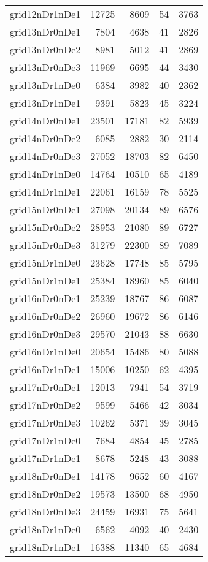 \begin{tabular}{lrrrr}
grid12nDr1nDe1 & 12725 & 8609 & 54 & 3763 \\
grid13nDr0nDe1 & 7804 & 4638 & 41 & 2826 \\
grid13nDr0nDe2 & 8981 & 5012 & 41 & 2869 \\
grid13nDr0nDe3 & 11969 & 6695 & 44 & 3430 \\
grid13nDr1nDe0 & 6384 & 3982 & 40 & 2362 \\
grid13nDr1nDe1 & 9391 & 5823 & 45 & 3224 \\
grid14nDr0nDe1 & 23501 & 17181 & 82 & 5939 \\
grid14nDr0nDe2 & 6085 & 2882 & 30 & 2114 \\
grid14nDr0nDe3 & 27052 & 18703 & 82 & 6450 \\
grid14nDr1nDe0 & 14764 & 10510 & 65 & 4189 \\
grid14nDr1nDe1 & 22061 & 16159 & 78 & 5525 \\
grid15nDr0nDe1 & 27098 & 20134 & 89 & 6576 \\
grid15nDr0nDe2 & 28953 & 21080 & 89 & 6727 \\
grid15nDr0nDe3 & 31279 & 22300 & 89 & 7089 \\
grid15nDr1nDe0 & 23628 & 17748 & 85 & 5795 \\
grid15nDr1nDe1 & 25384 & 18960 & 85 & 6040 \\
grid16nDr0nDe1 & 25239 & 18767 & 86 & 6087 \\
grid16nDr0nDe2 & 26960 & 19672 & 86 & 6146 \\
grid16nDr0nDe3 & 29570 & 21043 & 88 & 6630 \\
grid16nDr1nDe0 & 20654 & 15486 & 80 & 5088 \\
grid16nDr1nDe1 & 15006 & 10250 & 62 & 4395 \\
grid17nDr0nDe1 & 12013 & 7941 & 54 & 3719 \\
grid17nDr0nDe2 & 9599 & 5466 & 42 & 3034 \\
grid17nDr0nDe3 & 10262 & 5371 & 39 & 3045 \\
grid17nDr1nDe0 & 7684 & 4854 & 45 & 2785 \\
grid17nDr1nDe1 & 8678 & 5248 & 43 & 3088 \\
grid18nDr0nDe1 & 14178 & 9652 & 60 & 4167 \\
grid18nDr0nDe2 & 19573 & 13500 & 68 & 4950 \\
grid18nDr0nDe3 & 24459 & 16931 & 75 & 5641 \\
grid18nDr1nDe0 & 6562 & 4092 & 40 & 2430 \\
grid18nDr1nDe1 & 16388 & 11340 & 65 & 4684 \\

\end{tabular}
